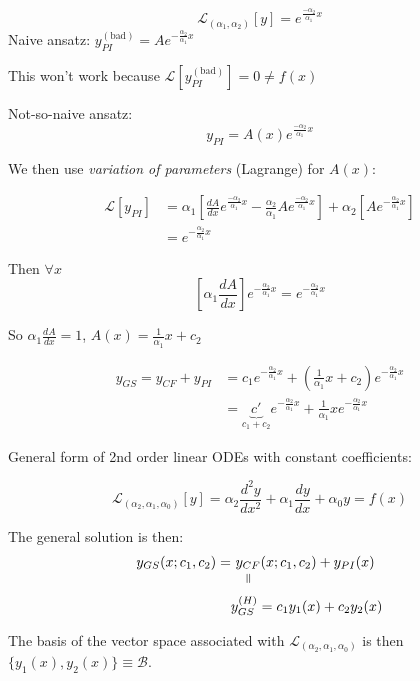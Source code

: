\documentclass[10pt]{scrartcl}
\begin{document}
\begin{example}
\[\mathcal{L}_{(\alpha_1,\alpha_2)}[y] = e^{\frac{-\alpha_2}{\alpha_1}x}\]	
Naive ansatz: $y_{PI}^{(\mathrm{bad})} = Ae^{-\frac{\alpha_2}{\alpha_1}x}$

This won't work because $\mathcal{L}[y_{PI}^{(\mathrm{bad})}] = 0 \neq f(x)$

Not-so-naive ansatz: 
\[y_{PI} = A(x)e^{\frac{-\alpha_2}{\alpha_1}x}\]

We then use \emph{variation of parameters} (Lagrange) for $A(x)$: 

\[
\begin{aligned}
  \mathcal{L}[y_{PI}] &= \alpha_1\left[\frac{dA}{dx}e^{\frac{-\alpha_2}{\alpha_1}x} - \frac{\alpha_2}{\alpha_1}Ae^{\frac{-\alpha_2}{\alpha_1}x}\right] + \alpha_2\left[Ae^{-\frac{\alpha_2}{\alpha_1}x}\right]\\
  &= e^{-\frac{\alpha_2}{\alpha_1}x}
\end{aligned}
\]

Then $\forall x$ 
\[\left[\alpha_1\frac{dA}{dx}\right]e^{-\frac{\alpha_2}{\alpha_1}x} = e^{-\frac{\alpha_2}{\alpha_1}x}\]

So $\alpha_1\frac{dA}{dx} = 1$, $A(x) = \frac{1}{\alpha_1}x + c_2$

\[
\begin{aligned}
  y_{GS} = y_{CF} + y_{PI} &= c_1e^{-\frac{\alpha_2}{\alpha_1}x} + \left(\frac{1}{\alpha_1}x + c_2\right)e^{-\frac{\alpha_2}{\alpha_1}x}\\
  &= \underbrace{c'}_{c_1 + c_2}e^{-\frac{\alpha_2}{\alpha_1}x} + \frac{1}{\alpha_1}xe^{-\frac{\alpha_2}{\alpha_1}x}
\end{aligned}
\]
\end{example}\vspace*{5pt}

General form of 2nd order linear ODEs with constant coefficients:

\[\mathcal{L}_{(\alpha_2,\alpha_1,\alpha_0)}[y] = \alpha_2\frac{d^2y}{dx^2} + \alpha_1\frac{dy}{dx} + \alpha_0y = f(x)\]

The general solution is then:
\[
\begin{aligned}
  y_{GS}(x;c_1,c_2) = &~\equalto{y_{CF}}{}(x;c_1,c_2) + y_{PI}(x)\\
  &y_{GS}^{(H)} = c_1y_1(x) + c_2y_2(x)
\end{aligned}
\]

The basis of the vector space associated with $\mathcal{L}_{(\alpha_2,\alpha_1,\alpha_0)}$ is then $\{y_1(x),y_2(x)\} \equiv \mathcal{B}$. 
\end{document}
